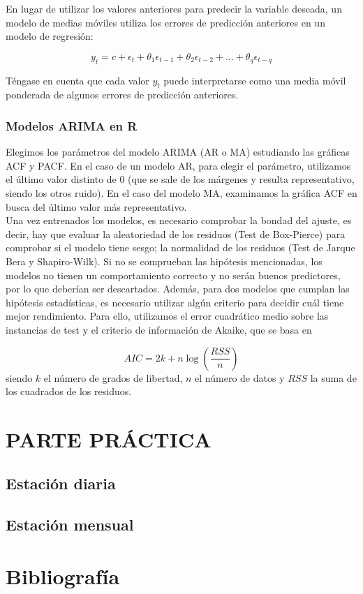 En lugar de utilizar los valores anteriores para predecir la variable deseada, un modelo de medias móviles utiliza los errores de predicción anteriores en un modelo de regresión:

$$y_t = c + \epsilon_t + \theta_1 \epsilon_{t-1} + \theta_2 \epsilon_{t-2} + \dots + \theta_q \epsilon_{t-q}$$

Téngase en cuenta que cada valor $y_t$ puede interpretarse como una media móvil ponderada de algunos errores de predicción anteriores.

\subsubsection{Modelos ARIMA en R}

Elegimos los parámetros del modelo ARIMA (AR o MA) estudiando las gráficas ACF y PACF. En el caso de un modelo AR, para elegir el parámetro, utilizamos el último valor distinto de 0 (que se sale de los márgenes y resulta representativo, siendo los otros ruido). En el caso del modelo MA, examinamos la gráfica ACF en busca del último valor más representativo. \\

Una vez entrenados los modelos, es necesario comprobar la bondad del ajuste, es decir, hay que evaluar la aleatoriedad de los residuos (Test de Box-Pierce) para comprobar si el modelo tiene sesgo; la normalidad de los residuos (Test de Jarque Bera y Shapiro-Wilk). Si no se comprueban las hipótesis mencionadas, los modelos no tienen un comportamiento correcto y no serán buenos predictores, por lo que deberían ser descartados. Además, para dos modelos que cumplan las hipótesis estadísticas, es necesario utilizar algún criterio para decidir cuál tiene mejor rendimiento. Para ello, utilizamos el error cuadrático medio sobre las instancias de test y el criterio de información de Akaike, que se basa en

$$ AIC = 2k + n\log(\frac{RSS}{n})$$
siendo $k$ el número de grados de libertad, $n$ el número de datos y $RSS$ la suma de los cuadrados de los residuos. 
\newpage
\section{PARTE PRÁCTICA}

\subsection{Estación diaria}

\subsection{Estación mensual}

\newpage
\section{Bibliografía}




